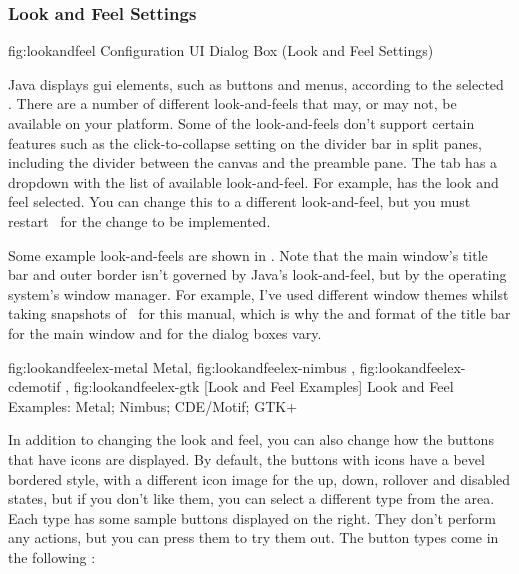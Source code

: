 
\subsubsection{Look and Feel Settings}\label{sec:lookandfeel}


\FloatFig
  {fig:lookandfeel}
  {}
  {Configuration UI Dialog Box (Look and Feel Settings)}

Java displays \gls{gui} elements, such as buttons and menus,
according to the selected . There are a number of
different \glspl{look-and-feel} that may, or may not, be available on your
platform. Some of the \glspl{look-and-feel} don't support certain features
such as the click-to-collapse setting on the divider bar in split
panes, including the divider between the \gls{canvas} and the preamble
pane. The  tab has a
\gls{dropdown} with the list of available \gls{look-and-feel}. For
example,  has the  look and
feel selected. You can change this to a different \gls{look-and-feel}, but
you must restart \FlowframTk\ for the change to be implemented.

Some example \glspl{look-and-feel} are shown in .
Note that the main window's title bar and outer border isn't
governed by Java's \gls{look-and-feel}, but by the operating
system's window manager. For example, I've used different window
themes whilst taking snapshots of \FlowframTk\ for this manual,
which is why the  and format of the title bar for the main
window and for the dialog boxes vary.

{
  {fig:lookandfeelex-metal}
    {}{Metal},
  {fig:lookandfeelex-nimbus}
    {}{},
  {fig:lookandfeelex-cdemotif}
    {}{},
  {fig:lookandfeelex-gtk}
    {}{}
}
[Look and Feel Examples]
{Look and Feel Examples:
 Metal;
 Nimbus;
 CDE\slash Motif;
 GTK+}

In addition to changing the look and feel, you can also change how
the buttons that have icons are displayed. By default, the buttons
with icons have a bevel bordered style, with a different icon image for
the up, down, rollover and disabled states, but if you don't like
them, you can select a different type from the
 area. Each type has some sample
buttons displayed on the right. They don't perform any actions, but
you can press them to try them out. The button types come in the
following :


